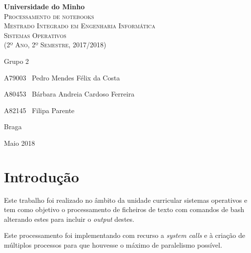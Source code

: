 \documentclass[12pt,a4paper]{report}
\begin{document}
\newcommand{\outputStart}[0]{$>>>$}
\newcommand{\outputEnd}[0]{$<<<$}

\begin{titlepage}
    \center
    {\huge {\bf Universidade do Minho}}\\[0.4cm]
    \vspace{3.0cm}
    \textsc{\huge{Processamento de notebooks}}\\[0.5cm]
    \vspace{3.0cm}
    \textsc{\huge{Mestrado Integrado em Engenharia Informática}}\\[0.5cm]
    \vspace{2.0cm}
    \textsc{Sistemas Operativos}\\[0.5cm]
    \textsc{(2º Ano, 2º Semestre, 2017/2018)}\\[0.5cm]
    \vspace{1.5cm}
    \begin{flushleft}
        Grupo 2
        \vspace{0.2cm}

        A79003 \,\,\,Pedro Mendes Félix da Costa
        \vspace{0.2cm}

        A80453 \,\,\,Bárbara Andreia Cardoso Ferreira
        \vspace{0.2cm}

        A82145 \,\,\,Filipa Parente
    \end{flushleft}
        \vspace{1cm}
    \begin{flushright}
        Braga

        Maio 2018
    \end{flushright}

\end{titlepage}

\tableofcontents
\clearpage

\chapter{Introdução}
    Este trabalho foi realizado no âmbito da unidade curricular sistemas
    operativos e tem como objetivo o processamento de ficheiros de texto
    com comandos de bash alterando estes para incluir o \textit{output} destes.

    Este processamento foi implementando com recurso a \textit{system calls}
    e à criação de múltiplos processos para que houvesse o máximo de
    paralelismo possível.
\end{document}

